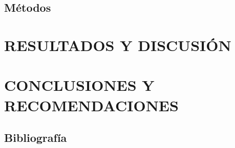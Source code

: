 \documentclass{tesis}
\begin{document}
\section{Métodos}


\chapter{RESULTADOS Y DISCUSIÓN}

\chapter{CONCLUSIONES Y RECOMENDACIONES}





\section{Bibliografía}

\end{document}
